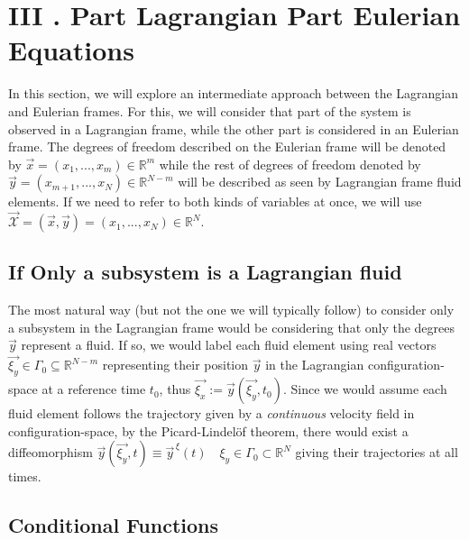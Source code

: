 \documentclass[11pt, a4paper]{article} %
\newcommand{\R}{\mathbb{R}} %
\newcommand{\x}{\mathcal{X}}
\begin{document}
\newpage



\section*{III . Part Lagrangian Part Eulerian Equations \vspace{-0.2cm}}
In this section, we will explore an intermediate approach between the Lagrangian and Eulerian frames. For this, we will consider that part of the system is observed in a Lagrangian frame, while the other part is considered in an Eulerian frame. The degrees of freedom described on the Eulerian frame will be denoted by $\vec{x}=(x_1,...,x_m)\in\R^m$ while the rest of degrees of freedom denoted by $\vec{y}=(x_{m+1},...,x_N)\in\R^{N-m}$ will be described as seen by Lagrangian frame fluid elements. If we need to refer to both kinds of variables at once, we will use $\vec{\x}=(\vec{x}, \vec{y})=(x_1,...,x_N)\in \R^N$.\vspace{-0.4cm}

\subsection*{If Only a subsystem is a Lagrangian fluid\vspace{-0.3cm}}

The most natural way (but not the one we will typically follow) to consider only a subsystem in the Lagrangian frame would be considering that only the degrees $\vec{y}$ represent a fluid. If so, we would label each fluid element using real vectors $\vec{\xi_y}\in\Gamma_0\subseteq \R^{N-m}$ representing their position $\vec{y}$ in the Lagrangian configuration-space at a reference time $t_0$, thus $\vec{\xi_x}:=\vec{y}( \vec{\xi_y},t_0)$. Since we would assume each fluid element follows the trajectory given by a {\em continuous} velocity field in configuration-space, by the Picard-Lindelöf theorem, there would exist a diffeomorphism $\vec{y}(\vec{\xi_y},t)\equiv \vec{y}^{\, \xi}(t) \quad \xi_y \in \Gamma_0 \subset \R^N$ giving their trajectories at all times. \vspace{-0.4cm}

\subsection*{Conditional Functions\vspace{-0.3cm}}
\end{document}
